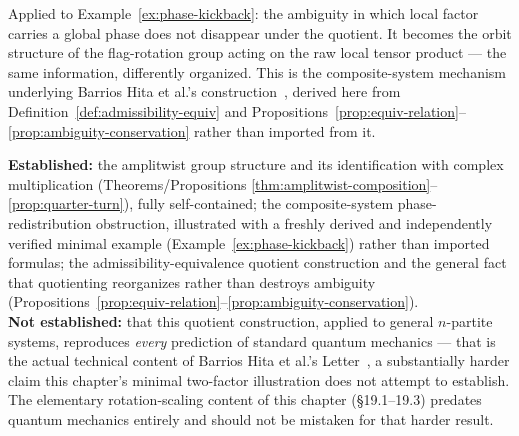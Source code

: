\begin{remark}
Applied to Example~\ref{ex:phase-kickback}: the ambiguity in which local
factor carries a global phase does not disappear under the quotient. It
becomes the orbit structure of the flag-rotation group acting on the raw
local tensor product — the same information, differently organized. This
is the composite-system mechanism underlying
Barrios Hita et al.'s construction~\cite{barrios-hita-2026}, derived here
from Definition~\ref{def:admissibility-equiv} and
Propositions~\ref{prop:equiv-relation}--\ref{prop:ambiguity-conservation}
rather than imported from it.
\end{remark}

\begin{ledgerentry}
\textbf{Established:} the amplitwist group structure and its identification
with complex multiplication (Theorems/Propositions
\ref{thm:amplitwist-composition}--\ref{prop:quarter-turn}), fully
self-contained; the composite-system phase-redistribution obstruction,
illustrated with a freshly derived and independently verified minimal
example (Example~\ref{ex:phase-kickback}) rather than imported formulas;
the admissibility-equivalence quotient construction and the general fact
that quotienting reorganizes rather than destroys ambiguity
(Propositions~\ref{prop:equiv-relation}--\ref{prop:ambiguity-conservation}).\\
\textbf{Not established:} that this quotient construction, applied to
general $n$-partite systems, reproduces \emph{every} prediction of standard
quantum mechanics — that is the actual technical content of Barrios Hita et
al.'s Letter~\cite{barrios-hita-2026}, a substantially harder claim this
chapter's minimal two-factor illustration does not attempt to establish.
The elementary rotation-scaling content of this chapter (\S19.1--19.3)
predates quantum mechanics entirely and should not be mistaken for that
harder result.
\end{ledgerentry}
